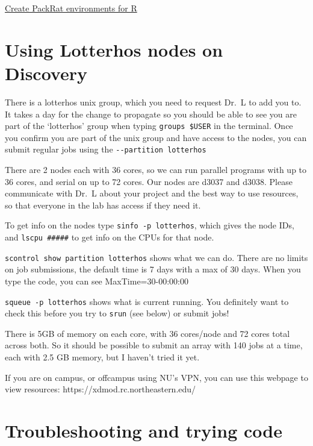 \documentclass[
  letterpaper,
  DIV=11,
  numbers=noendperiod]{scrreprt}
\begin{document}
\href{https://rc-docs.northeastern.edu/en/latest/software/software.html}{Create
PackRat environments for R}

\hypertarget{using-lotterhos-nodes-on-discovery}{%
\section*{\texorpdfstring{\textbf{Using Lotterhos nodes on
Discovery}}{Using Lotterhos nodes on Discovery}}\label{using-lotterhos-nodes-on-discovery}}


There is a lotterhos unix group, which you need to request Dr.~L to add
you to. It takes a day for the change to propagate so you should be able
to see you are part of the `lotterhos' group when typing
\texttt{groups\ \$USER} in the terminal. Once you confirm you are part
of the unix group and have access to the nodes, you can submit regular
jobs using the \texttt{-\/-partition\ lotterhos}

There are 2 nodes each with 36 cores, so we can run parallel programs
with up to 36 cores, and serial on up to 72 cores. Our nodes are d3037
and d3038. Please communicate with Dr.~L about your project and the best
way to use resources, so that everyone in the lab has access if they
need it.

To get info on the nodes type \texttt{sinfo\ -p\ lotterhos}, which gives
the node IDs, and \texttt{lscpu\ \#\#\#\#\#} to get info on the CPUs for
that node.

\texttt{scontrol\ show\ partition\ lotterhos} shows what we can do.
There are no limits on job submissions, the default time is 7 days with
a max of 30 days. When you type the code, you can see
MaxTime=30-00:00:00

\texttt{squeue\ -p\ lotterhos} shows what is current running. You
definitely want to check this before you try to \texttt{srun} (see
below) or submit jobs!

There is 5GB of memory on each core, with 36 cores/node and 72 cores
total across both. So it should be possible to submit an array with 140
jobs at a time, each with 2.5 GB memory, but I haven't tried it yet.

If you are on campus, or offcampus using NU's VPN, you can use this
webpage to view resources: https://xdmod.rc.northeastern.edu/

\hypertarget{troubleshooting-and-trying-code}{%
\section*{\texorpdfstring{\textbf{Troubleshooting and trying
code}}{Troubleshooting and trying code}}\label{troubleshooting-and-trying-code}}
\end{document}
